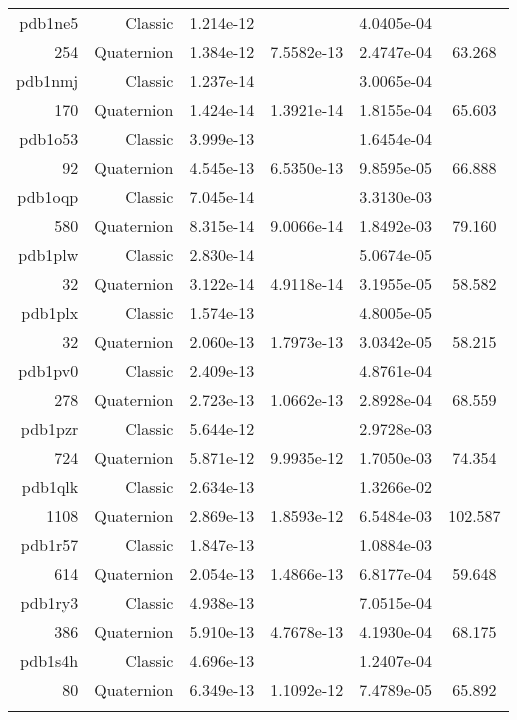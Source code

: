 \begin{xltabular}{\textwidth}{r|rS[table-format=1.3e+2]S[table-format=1.4e+2]S[table-format=1.4e+2]S[table-format=-1.3]}
pdb1ne5 & Classic & 1.214e-12 &  & 4.0405e-04 & \\
254 & Quaternion & 1.384e-12 & 7.5582e-13 & 2.4747e-04 & 63.268\\  \addlinespace
pdb1nmj & Classic & 1.237e-14 &  & 3.0065e-04 & \\
170 & Quaternion & 1.424e-14 & 1.3921e-14 & 1.8155e-04 & 65.603\\  \addlinespace
pdb1o53 & Classic & 3.999e-13 &  & 1.6454e-04 & \\
92 & Quaternion & 4.545e-13 & 6.5350e-13 & 9.8595e-05 & 66.888\\  \addlinespace
pdb1oqp & Classic & 7.045e-14 &  & 3.3130e-03 & \\
580 & Quaternion & 8.315e-14 & 9.0066e-14 & 1.8492e-03 & 79.160\\  \addlinespace
pdb1plw & Classic & 2.830e-14 &  & 5.0674e-05 & \\
32 & Quaternion & 3.122e-14 & 4.9118e-14 & 3.1955e-05 & 58.582\\  \addlinespace
pdb1plx & Classic & 1.574e-13 &  & 4.8005e-05 & \\
32 & Quaternion & 2.060e-13 & 1.7973e-13 & 3.0342e-05 & 58.215\\  \addlinespace
pdb1pv0 & Classic & 2.409e-13 &  & 4.8761e-04 & \\
278 & Quaternion & 2.723e-13 & 1.0662e-13 & 2.8928e-04 & 68.559\\  \addlinespace
pdb1pzr & Classic & 5.644e-12 &  & 2.9728e-03 & \\
724 & Quaternion & 5.871e-12 & 9.9935e-12 & 1.7050e-03 & 74.354\\  \addlinespace
pdb1qlk & Classic & 2.634e-13 &  & 1.3266e-02 & \\
1108 & Quaternion & 2.869e-13 & 1.8593e-12 & 6.5484e-03 & 102.587\\  \addlinespace
pdb1r57 & Classic & 1.847e-13 &  & 1.0884e-03 & \\
614 & Quaternion & 2.054e-13 & 1.4866e-13 & 6.8177e-04 & 59.648\\  \addlinespace
pdb1ry3 & Classic & 4.938e-13 &  & 7.0515e-04 & \\
386 & Quaternion & 5.910e-13 & 4.7678e-13 & 4.1930e-04 & 68.175\\  \addlinespace
pdb1s4h & Classic & 4.696e-13 &  & 1.2407e-04 & \\
80 & Quaternion & 6.349e-13 & 1.1092e-12 & 7.4789e-05 & 65.892\\  \addlinespace

\end{xltabular}
